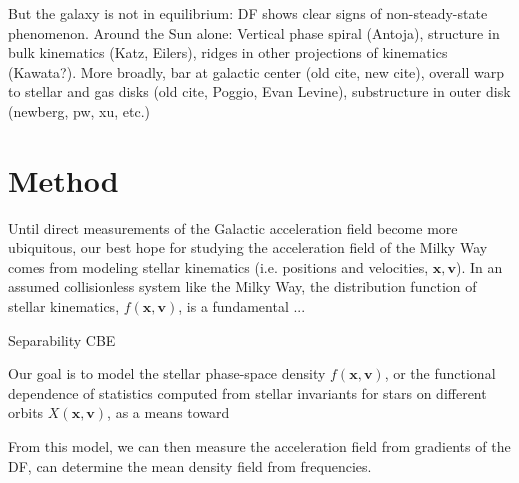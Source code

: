 But the galaxy is not in equilibrium: DF shows clear signs of non-steady-state phenomenon.
Around the Sun alone: Vertical phase spiral (Antoja), structure in bulk kinematics (Katz, Eilers), ridges in other projections of kinematics (Kawata?).
More broadly, bar at galactic center (old cite, new cite), overall warp to stellar and gas disks (old cite, Poggio, Evan Levine), substructure in outer disk (newberg, pw, xu, etc.)






\section{Method} \label{sec:method}


Until direct measurements of the Galactic acceleration field become more ubiquitous, our
best hope for studying the acceleration field of the Milky Way comes from modeling
stellar kinematics (i.e. positions and velocities, $\boldsymbol{x}, \boldsymbol{v}$).
In an assumed collisionless system like the Milky Way, the distribution function of
stellar kinematics, $f(\boldsymbol{x}, \boldsymbol{v})$, is a fundamental ...

Separability
CBE

Our goal is to model the stellar phase-space density
$f(\boldsymbol{x}, \boldsymbol{v})$, or the functional dependence of statistics computed
from stellar invariants for stars on different orbits $X(\boldsymbol{x},
\boldsymbol{v})$, as a means toward

From this model, we can then measure the acceleration field from gradients of the DF, can determine the mean density field from frequencies.


